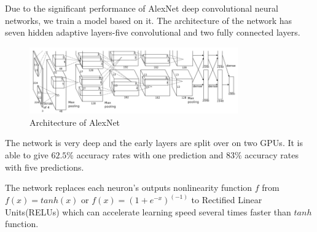 Due to the significant performance of AlexNet \citep{krizhevsky2012imagenet} deep convolutional neural networks, we train a model based on it. The architecture of the network has seven hidden adaptive layers-five convolutional and two fully connected layers.
\begin{figure}[!htb]
    \centering
	\includegraphics[width=0.8\textwidth]{AlexNet.png}
    \caption{Architecture of AlexNet}%
    \label{fig:ImageNetArch}%
\end{figure}
The network is very deep and the early layers are split over on two GPUs. It is able to give $62.5\%$ accuracy rates with one prediction and $83\%$ accuracy rates with five predictions.

The network replaces each neuron's outputs nonlinearity function $f$ from $f(x) = tanh(x)$ or $f(x) = (1 + e^{-x})^(-1)$ to Rectified Linear Units(RELUs)\citep{nair2010rectified} which can accelerate learning speed several times faster than $tanh$ function. 

